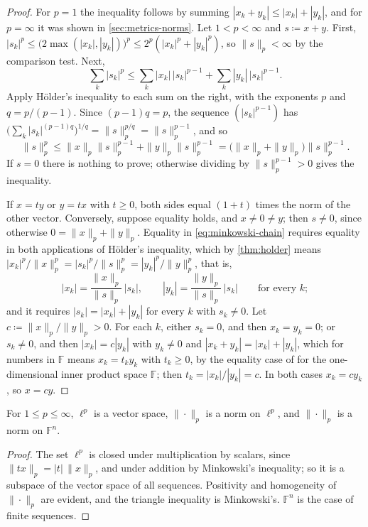 \begin{proof}
For $p=1$ the inequality follows by summing $|x_k+y_k|\le|x_k|+|y_k|$, and for $p=\infty$ it was shown in \cref{sec:metrics-norms}. Let $1<p<\infty$ and $s\coloneqq x+y$. First, $|s_k|^p\le\bigl(2\max(|x_k|,|y_k|)\bigr)^p\le2^p(|x_k|^p+|y_k|^p)$, so $\|s\|_p<\infty$ by the comparison test. Next,
\[
\sum_k|s_k|^p\le\sum_k|x_k|\,|s_k|^{p-1}+\sum_k|y_k|\,|s_k|^{p-1}.
\]
Apply H\"older's inequality to each sum on the right, with the exponents $p$ and $q=p/(p-1)$. Since $(p-1)q=p$, the sequence $(|s_k|^{p-1})$ has $\bigl(\sum_k|s_k|^{(p-1)q}\bigr)^{1/q}=\|s\|_p^{p/q}=\|s\|_p^{p-1}$, and so
\begin{equation}
\|s\|_p^p\le\|x\|_p\|s\|_p^{p-1}+\|y\|_p\|s\|_p^{p-1}=\bigl(\|x\|_p+\|y\|_p\bigr)\|s\|_p^{p-1}.
\label{eq:minkowski-chain}
\end{equation}
If $s=0$ there is nothing to prove; otherwise dividing by $\|s\|_p^{p-1}>0$ gives the inequality.

If $x=ty$ or $y=tx$ with $t\ge0$, both sides equal $(1+t)$ times the norm of the other vector. Conversely, suppose equality holds, and $x\ne0\ne y$; then $s\ne0$, since otherwise $0=\|x\|_p+\|y\|_p$. Equality in \eqref{eq:minkowski-chain} requires equality in both applications of H\"older's inequality, which by \cref{thm:holder} means $|x_k|^p/\|x\|_p^p=|s_k|^p/\|s\|_p^p=|y_k|^p/\|y\|_p^p$, that is,
\[
|x_k|=\frac{\|x\|_p}{\|s\|_p}\,|s_k|,\qquad|y_k|=\frac{\|y\|_p}{\|s\|_p}\,|s_k|\qquad\text{for every }k ;
\]
and it requires $|s_k|=|x_k|+|y_k|$ for every $k$ with $s_k\ne0$. Let $c\coloneqq\|x\|_p/\|y\|_p>0$. For each $k$, either $s_k=0$, and then $x_k=y_k=0$; or $s_k\ne0$, and then $|x_k|=c|y_k|$ with $y_k\ne0$ and $|x_k+y_k|=|x_k|+|y_k|$, which for numbers in $\mathbb F$ means $x_k=t_ky_k$ with $t_k\ge0$, by the equality case of  for the one-dimensional inner product space $\mathbb F$; then $t_k=|x_k|/|y_k|=c$. In both cases $x_k=cy_k$, so $x=cy$.
\end{proof}

\begin{corollary}
\label{cor:lp-normed}
For $1\le p\le\infty$, $\ell^p$ is a vector space, $\|\cdot\|_p$ is a norm on $\ell^p$, and $\|\cdot\|_p$ is a norm on $\mathbb F^n$.
\end{corollary}

\begin{proof}
The set $\ell^p$ is closed under multiplication by scalars, since $\|tx\|_p=|t|\,\|x\|_p$, and under addition by Minkowski's inequality; so it is a subspace of the vector space of all sequences. Positivity and homogeneity of $\|\cdot\|_p$ are evident, and the triangle inequality is Minkowski's. $\mathbb F^n$ is the case of finite sequences.
\end{proof}

